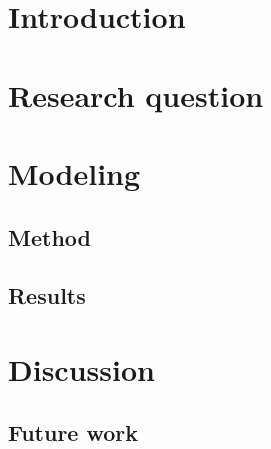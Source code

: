 



\maketitle

\begin{abstract}
\label{abstract}

\end{abstract}

\section{Introduction}
  \label{introduction}
  
  

%  

\section{Research question}
  \label{research-question}
  

\section{Modeling}
  \subsection{Method}
  \label{method}
  
  
  \subsection{Results}
  \label{results}
  

\section{Discussion}
  
  \subsection{Future work}
  




